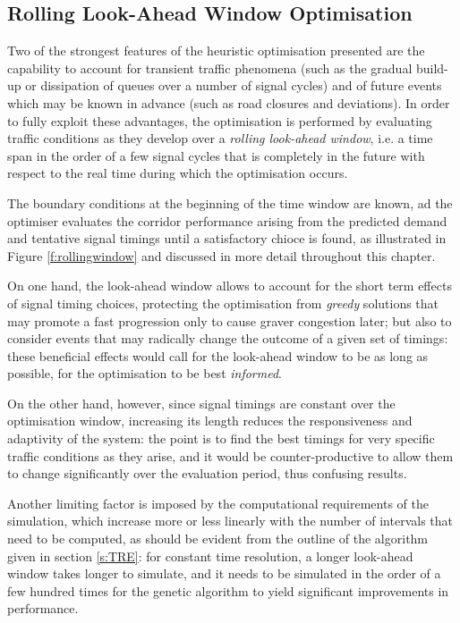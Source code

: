 
\subsection{Rolling Look-Ahead Window Optimisation}
Two of the strongest features of the heuristic optimisation presented are the capability to account for transient traffic phenomena (such as the gradual build-up or dissipation of queues over a number of signal cycles) and of future events which may be known in advance (such as road closures and deviations). In order to fully exploit these advantages, the optimisation is performed by evaluating traffic conditions as they develop over a \emph{rolling look-ahead window}, i.e. a time span in the order of a few signal cycles that is completely in the future with respect to the real time during which the optimisation occurs.

The boundary conditions at the beginning of the time window are known, ad the optimiser evaluates the corridor performance arising from the predicted demand and tentative signal timings until a satisfactory chioce is found, as illustrated in Figure \ref{f:rollingwindow} and discussed in more detail throughout this chapter.

On one hand, the look-ahead window allows to account for the short term effects of signal timing choices, protecting the optimisation from \emph{greedy} solutions that may promote a fast progression only to cause graver congestion later; but also to consider events that may radically change the outcome of a given set of timings: these beneficial effects would call for the look-ahead window to be as long as possible, for the optimisation to be best \emph{informed}.

On the other hand, however, since signal timings are constant over the optimisation window, increasing its length reduces the responsiveness and adaptivity of the system: the point is to find the best timings for very specific traffic conditions as they arise, and it would be counter-productive to allow them to change significantly over the evaluation period, thus confusing results.

Another limiting factor is imposed by the computational requirements of the simulation, which increase more or less linearly with the number of intervals that need to be computed, as should be evident from the outline of the algorithm given in section \ref{s:TRE}: for constant time resolution, a longer look-ahead window takes longer to simulate, and it needs to be simulated in the order of a few hundred times for the genetic algorithm to yield significant improvements in performance. 

